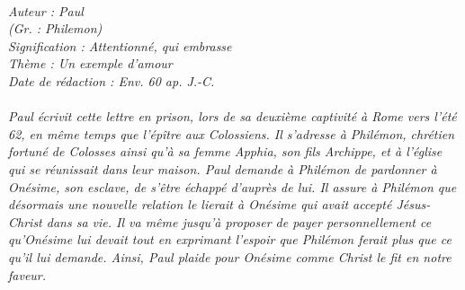 \BFont
\noindent\hrulefill
{\footnotesize
\textit{
\bigskip
{\centering{}
\\Auteur : Paul
\\(Gr. : Philemon)
\\Signification : Attentionné, qui embrasse
\\Thème : Un exemple d'amour
\\Date de rédaction : Env. 60 ap. J.-C.\\}
}
\textit{
\\Paul écrivit cette lettre en prison, lors de sa deuxième captivité à Rome vers l’été 62, en même temps que l’épître aux Colossiens. Il s’adresse à Philémon, chrétien fortuné de Colosses ainsi qu’à sa femme Apphia, son fils Archippe, et à l’église qui se réunissait dans leur maison. Paul demande à Philémon de pardonner à Onésime, son esclave, de s’être échappé d’auprès de lui. Il assure à Philémon que désormais une nouvelle relation le lierait à Onésime qui avait accepté Jésus-Christ dans sa vie. Il va même jusqu’à proposer de payer personnellement ce qu’Onésime lui devait tout en exprimant l’espoir que Philémon ferait plus que ce qu’il lui demande. Ainsi, Paul plaide pour Onésime comme Christ le fit en notre faveur.\bigskip
}
}
\par\nobreak\noindent\hrulefill
